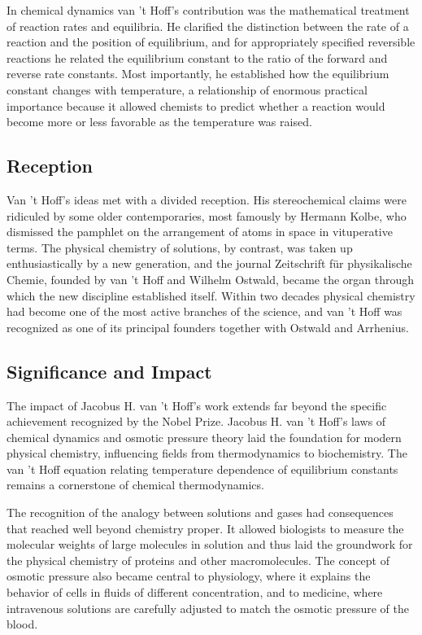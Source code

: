 In chemical dynamics van 't Hoff's contribution was the mathematical treatment of reaction rates and equilibria. He clarified the distinction between the rate of a reaction and the position of equilibrium, and for appropriately specified reversible reactions he related the equilibrium constant to the ratio of the forward and reverse rate constants. Most importantly, he established how the equilibrium constant changes with temperature, a relationship of enormous practical importance because it allowed chemists to predict whether a reaction would become more or less favorable as the temperature was raised.

\subsection*{Reception}

Van 't Hoff's ideas met with a divided reception. His stereochemical claims were ridiculed by some older contemporaries, most famously by Hermann Kolbe, who dismissed the pamphlet on the arrangement of atoms in space in vituperative terms. The physical chemistry of solutions, by contrast, was taken up enthusiastically by a new generation, and the journal Zeitschrift für physikalische Chemie, founded by van 't Hoff and Wilhelm Ostwald, became the organ through which the new discipline established itself. Within two decades physical chemistry had become one of the most active branches of the science, and van 't Hoff was recognized as one of its principal founders together with Ostwald and Arrhenius.

\subsection*{Significance and Impact}

The impact of Jacobus H. van 't Hoff's work extends far beyond the specific achievement recognized by the Nobel Prize.
Jacobus H. van 't Hoff's laws of chemical dynamics and osmotic pressure theory laid the foundation for modern physical chemistry, influencing fields from thermodynamics to biochemistry. The van 't Hoff equation relating temperature dependence of equilibrium constants remains a cornerstone of chemical thermodynamics.

The recognition of the analogy between solutions and gases had consequences that reached well beyond chemistry proper. It allowed biologists to measure the molecular weights of large molecules in solution and thus laid the groundwork for the physical chemistry of proteins and other macromolecules. The concept of osmotic pressure also became central to physiology, where it explains the behavior of cells in fluids of different concentration, and to medicine, where intravenous solutions are carefully adjusted to match the osmotic pressure of the blood.

